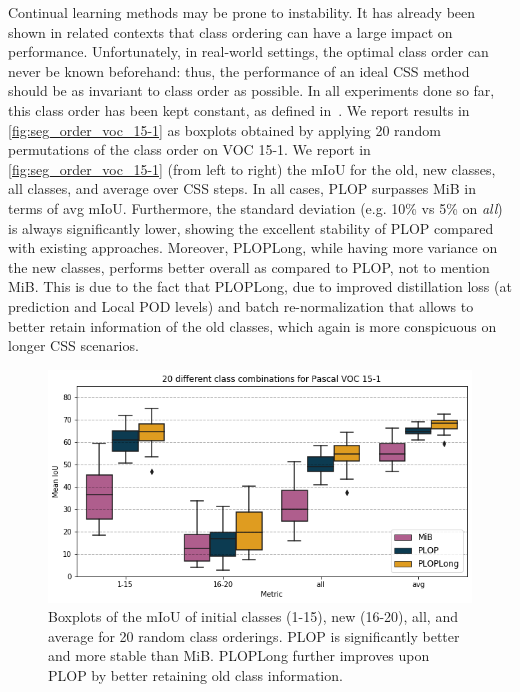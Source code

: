 Continual learning methods may be prone to instability. It has already been shown in related
contexts \cite{kim2019medic} that class ordering can have a large impact on performance.
Unfortunately, in real-world settings, the optimal class order can never be known beforehand: thus,
the performance of an ideal \ac{CSS} method should be as invariant to class order as possible. In all
experiments done so far, this class order has been kept constant, as defined
in~\cite{cermelli2020modelingthebackground}. We report results in \autoref{fig:seg_order_voc_15-1}
as boxplots obtained by applying 20 random permutations of the class order on VOC 15-1. We report in
\autoref{fig:seg_order_voc_15-1} (from left to right) the \ac{mIoU} for the old, new classes, all
classes, and average over \ac{CSS} steps. In all cases, PLOP surpasses MiB in terms of avg \ac{mIoU}.
Furthermore, the standard deviation (e.g. 10\% vs 5\% on \textit{all}) is always significantly
lower, showing the excellent stability of PLOP compared with existing approaches. Moreover,
PLOPLong, while having more variance on the new classes, performs better overall as compared to
PLOP, not to mention MiB. This is due to the fact that PLOPLong, due to improved distillation loss
(at prediction and Local POD levels) and batch re-normalization that allows to better retain
information of the old classes, which again is more conspicuous on longer \ac{CSS} scenarios.




\begin{figure}
    \includegraphics[width=\linewidth]{images/seg/order_voc_15-1.png}
    \vspace*{-0.3cm}
    \caption{Boxplots of the \ac{mIoU} of initial classes (1-15), new (16-20), all, and average for
        20 random class orderings. PLOP is significantly better and more stable than MiB. PLOPLong
        further improves upon PLOP by better retaining old class information.}
    \label{fig:seg_order_voc_15-1}
\end{figure}


